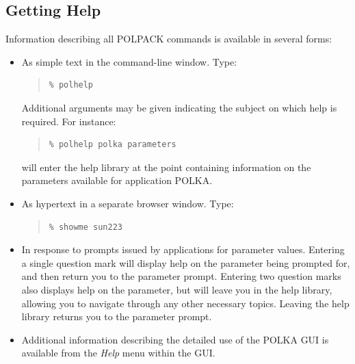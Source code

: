 \documentclass[twoside,11pt]{article}
\newcommand{\xlabel}[1]{}
\renewcommand{\_}{\texttt{\symbol{95}}}
\newenvironment{myquote}{\begin{quote}\begin{small}}{\end{small}\end{quote}}
\begin{document}
\subsection{\xlabel{gettinghelp}Getting Help}
Information describing all POLPACK commands is available in several forms: 
\begin{itemize}
\item As simple text in the command-line window. Type:

\begin{myquote}
\begin{verbatim}
% polhelp
\end{verbatim}
\end{myquote}

Additional arguments may be given indicating the subject on which help is
required. For instance:

\begin{myquote}
\begin{verbatim}
% polhelp polka parameters
\end{verbatim}
\end{myquote}

will enter the help library at the point containing information on the
parameters available for application POLKA.

\item As hypertext in a separate browser window. Type:

\begin{myquote}
\begin{verbatim}
% showme sun223
\end{verbatim}
\end{myquote}

\item In response to prompts issued by applications for parameter values. 
Entering a single question mark will display help on the parameter being
prompted for, and then return you to the parameter prompt. Entering two
question marks also displays help on the parameter, but will leave you in the
help library, allowing you to navigate through any other necessary
topics. Leaving the help library returns you to the parameter prompt.

\item Additional information describing the detailed use of the POLKA
GUI is available from the \emph{Help} menu within the GUI.

\end{itemize}
\end{document}
